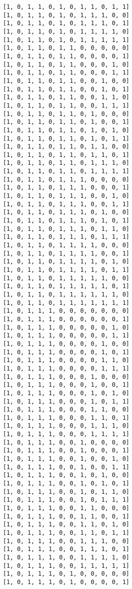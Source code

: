 \documentclass[11pt]{article}
\begin{document}
\begin{Verbatim}[commandchars=\\\{\}]
[1, 0, 1, 1, 0, 1, 0, 1, 1, 0, 1, 1]
[1, 0, 1, 1, 0, 1, 0, 1, 1, 1, 0, 0]
[1, 0, 1, 1, 0, 1, 0, 1, 1, 1, 0, 1]
[1, 0, 1, 1, 0, 1, 0, 1, 1, 1, 1, 0]
[1, 0, 1, 1, 0, 1, 0, 1, 1, 1, 1, 1]
[1, 0, 1, 1, 0, 1, 1, 0, 0, 0, 0, 0]
[1, 0, 1, 1, 0, 1, 1, 0, 0, 0, 0, 1]
[1, 0, 1, 1, 0, 1, 1, 0, 0, 0, 1, 0]
[1, 0, 1, 1, 0, 1, 1, 0, 0, 0, 1, 1]
[1, 0, 1, 1, 0, 1, 1, 0, 0, 1, 0, 0]
[1, 0, 1, 1, 0, 1, 1, 0, 0, 1, 0, 1]
[1, 0, 1, 1, 0, 1, 1, 0, 0, 1, 1, 0]
[1, 0, 1, 1, 0, 1, 1, 0, 0, 1, 1, 1]
[1, 0, 1, 1, 0, 1, 1, 0, 1, 0, 0, 0]
[1, 0, 1, 1, 0, 1, 1, 0, 1, 0, 0, 1]
[1, 0, 1, 1, 0, 1, 1, 0, 1, 0, 1, 0]
[1, 0, 1, 1, 0, 1, 1, 0, 1, 0, 1, 1]
[1, 0, 1, 1, 0, 1, 1, 0, 1, 1, 0, 0]
[1, 0, 1, 1, 0, 1, 1, 0, 1, 1, 0, 1]
[1, 0, 1, 1, 0, 1, 1, 0, 1, 1, 1, 0]
[1, 0, 1, 1, 0, 1, 1, 0, 1, 1, 1, 1]
[1, 0, 1, 1, 0, 1, 1, 1, 0, 0, 0, 0]
[1, 0, 1, 1, 0, 1, 1, 1, 0, 0, 0, 1]
[1, 0, 1, 1, 0, 1, 1, 1, 0, 0, 1, 0]
[1, 0, 1, 1, 0, 1, 1, 1, 0, 0, 1, 1]
[1, 0, 1, 1, 0, 1, 1, 1, 0, 1, 0, 0]
[1, 0, 1, 1, 0, 1, 1, 1, 0, 1, 0, 1]
[1, 0, 1, 1, 0, 1, 1, 1, 0, 1, 1, 0]
[1, 0, 1, 1, 0, 1, 1, 1, 0, 1, 1, 1]
[1, 0, 1, 1, 0, 1, 1, 1, 1, 0, 0, 0]
[1, 0, 1, 1, 0, 1, 1, 1, 1, 0, 0, 1]
[1, 0, 1, 1, 0, 1, 1, 1, 1, 0, 1, 0]
[1, 0, 1, 1, 0, 1, 1, 1, 1, 0, 1, 1]
[1, 0, 1, 1, 0, 1, 1, 1, 1, 1, 0, 0]
[1, 0, 1, 1, 0, 1, 1, 1, 1, 1, 0, 1]
[1, 0, 1, 1, 0, 1, 1, 1, 1, 1, 1, 0]
[1, 0, 1, 1, 0, 1, 1, 1, 1, 1, 1, 1]
[1, 0, 1, 1, 1, 0, 0, 0, 0, 0, 0, 0]
[1, 0, 1, 1, 1, 0, 0, 0, 0, 0, 0, 1]
[1, 0, 1, 1, 1, 0, 0, 0, 0, 0, 1, 0]
[1, 0, 1, 1, 1, 0, 0, 0, 0, 0, 1, 1]
[1, 0, 1, 1, 1, 0, 0, 0, 0, 1, 0, 0]
[1, 0, 1, 1, 1, 0, 0, 0, 0, 1, 0, 1]
[1, 0, 1, 1, 1, 0, 0, 0, 0, 1, 1, 0]
[1, 0, 1, 1, 1, 0, 0, 0, 0, 1, 1, 1]
[1, 0, 1, 1, 1, 0, 0, 0, 1, 0, 0, 0]
[1, 0, 1, 1, 1, 0, 0, 0, 1, 0, 0, 1]
[1, 0, 1, 1, 1, 0, 0, 0, 1, 0, 1, 0]
[1, 0, 1, 1, 1, 0, 0, 0, 1, 0, 1, 1]
[1, 0, 1, 1, 1, 0, 0, 0, 1, 1, 0, 0]
[1, 0, 1, 1, 1, 0, 0, 0, 1, 1, 0, 1]
[1, 0, 1, 1, 1, 0, 0, 0, 1, 1, 1, 0]
[1, 0, 1, 1, 1, 0, 0, 0, 1, 1, 1, 1]
[1, 0, 1, 1, 1, 0, 0, 1, 0, 0, 0, 0]
[1, 0, 1, 1, 1, 0, 0, 1, 0, 0, 0, 1]
[1, 0, 1, 1, 1, 0, 0, 1, 0, 0, 1, 0]
[1, 0, 1, 1, 1, 0, 0, 1, 0, 0, 1, 1]
[1, 0, 1, 1, 1, 0, 0, 1, 0, 1, 0, 0]
[1, 0, 1, 1, 1, 0, 0, 1, 0, 1, 0, 1]
[1, 0, 1, 1, 1, 0, 0, 1, 0, 1, 1, 0]
[1, 0, 1, 1, 1, 0, 0, 1, 0, 1, 1, 1]
[1, 0, 1, 1, 1, 0, 0, 1, 1, 0, 0, 0]
[1, 0, 1, 1, 1, 0, 0, 1, 1, 0, 0, 1]
[1, 0, 1, 1, 1, 0, 0, 1, 1, 0, 1, 0]
[1, 0, 1, 1, 1, 0, 0, 1, 1, 0, 1, 1]
[1, 0, 1, 1, 1, 0, 0, 1, 1, 1, 0, 0]
[1, 0, 1, 1, 1, 0, 0, 1, 1, 1, 0, 1]
[1, 0, 1, 1, 1, 0, 0, 1, 1, 1, 1, 0]
[1, 0, 1, 1, 1, 0, 0, 1, 1, 1, 1, 1]
[1, 0, 1, 1, 1, 0, 1, 0, 0, 0, 0, 0]
[1, 0, 1, 1, 1, 0, 1, 0, 0, 0, 0, 1]

\end{Verbatim}
\end{document}

